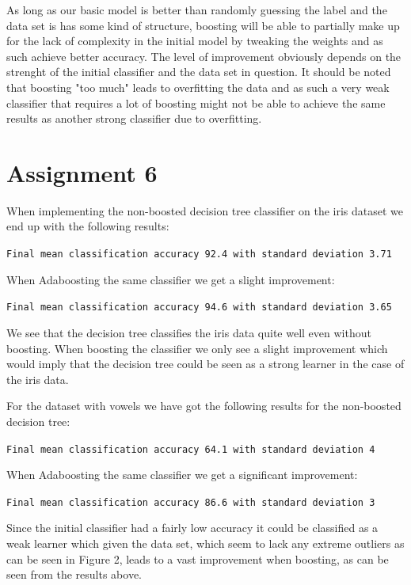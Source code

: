 \documentclass{article}
\begin{document}
As long as our basic model is better than randomly guessing the label and the data set is has some kind of structure, boosting will be able to partially make up for the lack of complexity in the initial model by tweaking the weights and as such achieve better accuracy. The level of improvement obviously depends on the strenght of the initial classifier and the data set in question. It should be noted that boosting "too much" leads to overfitting the data and as such a very weak classifier that requires a lot of boosting might not be able to achieve the same results as another strong classifier due to overfitting.


\section*{Assignment 6}

When implementing the non-boosted decision tree classifier on the iris dataset we end up with the following results:

\texttt{Final mean classification accuracy  92.4 with standard deviation 3.71}

When Adaboosting the same classifier we get a slight improvement:

\texttt{Final mean classification accuracy  94.6 with standard deviation 3.65}

We see that the decision tree classifies the iris data quite well even without boosting. When boosting the classifier we only see a slight improvement which would imply that the decision tree could be seen as a strong learner in the case of the iris data.

For the dataset with vowels we have got the following results for the non-boosted decision tree:

\texttt{Final mean classification accuracy  64.1 with standard deviation 4}

When Adaboosting the same classifier we get a significant improvement:

\texttt{Final mean classification accuracy  86.6 with standard deviation 3}

Since the initial classifier had a fairly low accuracy it could be classified as a weak learner which given the data set, which seem to lack any extreme outliers as can be seen in Figure 2, leads to a vast improvement when boosting, as can be seen from the results above.
\end{document}
